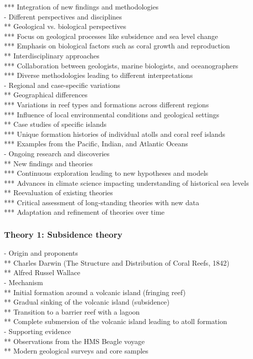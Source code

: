*** Integration of new findings and methodologies \\
- Different perspectives and disciplines \\
** Geological vs. biological perspectives \\
*** Focus on geological processes like subsidence and sea level change \\
*** Emphasis on biological factors such as coral growth and reproduction \\
** Interdisciplinary approaches \\
*** Collaboration between geologists, marine biologists, and oceanographers \\
*** Diverse methodologies leading to different interpretations \\
- Regional and case-specific variations \\
** Geographical differences \\
*** Variations in reef types and formations across different regions \\
*** Influence of local environmental conditions and geological settings \\
** Case studies of specific islands \\
*** Unique formation histories of individual atolls and coral reef islands \\
*** Examples from the Pacific, Indian, and Atlantic Oceans \\
- Ongoing research and discoveries \\
** New findings and theories \\
*** Continuous exploration leading to new hypotheses and models \\
*** Advances in climate science impacting understanding of historical sea levels \\
** Reevaluation of existing theories \\
*** Critical assessment of long-standing theories with new data \\
*** Adaptation and refinement of theories over time

\subsubsection{Theory 1: Subsidence theory}
- Origin and proponents \\
** Charles Darwin (The Structure and Distribution of Coral Reefs, 1842) \\
** Alfred Russel Wallace \\
- Mechanism \\
** Initial formation around a volcanic island (fringing reef) \\
** Gradual sinking of the volcanic island (subsidence) \\
** Transition to a barrier reef with a lagoon \\
** Complete submersion of the volcanic island leading to atoll formation \\
- Supporting evidence \\
** Observations from the HMS Beagle voyage \\
** Modern geological surveys and core samples

